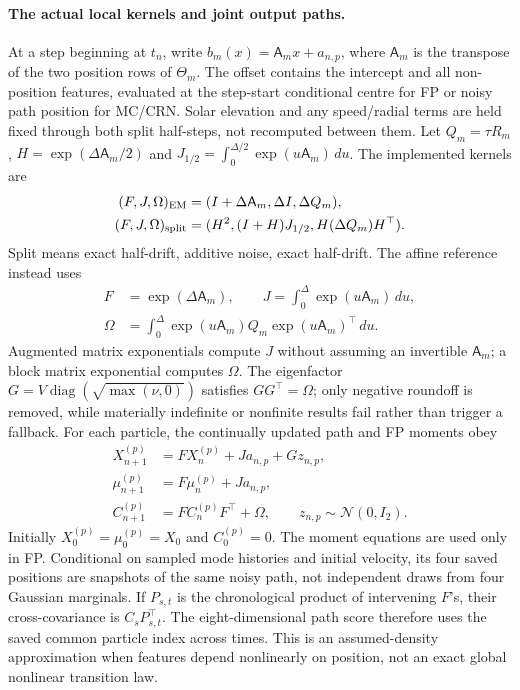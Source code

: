 \documentclass[11pt]{article}
\begin{document}
\paragraph{The actual local kernels and joint output paths.}
At a step beginning at \(t_n\), write
\(b_m(x)=\mathsf A_m x+a_{n,p}\), where \(\mathsf A_m\) is the transpose
of the two position rows of \(\Theta_m\).
The offset contains the intercept and all non-position features, evaluated
at the step-start conditional centre for FP or noisy path position for MC/CRN.
Solar elevation and any speed/radial terms are held fixed through both split
half-steps, not recomputed between them. Let \(Q_m=\tau R_m\),
\(H=\exp(\Delta\mathsf A_m/2)\) and
\(J_{1/2}=\int_0^{\Delta/2}\exp(u\mathsf A_m)\,du\). The implemented kernels are
\begin{equation}
 \begin{aligned}
 (F,J,\Omega)_{\rm EM}&=(I+\Delta\mathsf A_m,\Delta I,\Delta Q_m),\\
 (F,J,\Omega)_{\rm split}&=(H^2,(I+H)J_{1/2},H(\Delta Q_m)H^\top).
 \end{aligned}
 \label{eq:method-kernels}
\end{equation}
Split means exact half-drift, additive noise, exact half-drift. The affine
reference instead uses
\begin{equation}
 \begin{aligned}
 F&=\exp(\Delta\mathsf A_m),\qquad
 J=\int_0^\Delta\exp(u\mathsf A_m)\,du,\\
 \Omega&=\int_0^\Delta\exp(u\mathsf A_m)Q_m
                              \exp(u\mathsf A_m)^\top\,du.
 \end{aligned}
 \label{eq:method-affine-exact}
\end{equation}
Augmented matrix exponentials compute \(J\) without assuming an invertible
\(\mathsf A_m\); a block matrix exponential computes \(\Omega\).
The eigenfactor \(G=V\operatorname{diag}(\sqrt{\max(\nu,0)})\) satisfies
\(GG^\top=\Omega\); only negative roundoff is removed, while materially
indefinite or nonfinite results fail rather than trigger a fallback.
For each particle, the continually updated path and FP moments obey
\begin{equation}
 \begin{aligned}
 X_{n+1}^{(p)}&=F X_n^{(p)}+J a_{n,p}+Gz_{n,p},\\
 \mu_{n+1}^{(p)}&=F\mu_n^{(p)}+J a_{n,p},\\
 C_{n+1}^{(p)}&=F C_n^{(p)}F^\top+\Omega,
 \qquad z_{n,p}\sim\mathcal N(0,I_2).
 \end{aligned}
 \label{eq:method-joint-propagation}
\end{equation}
Initially \(X_0^{(p)}=\mu_0^{(p)}=X_0\) and \(C_0^{(p)}=0\).
The moment equations are used only in FP. Conditional on sampled mode
histories and initial velocity, its four saved positions are snapshots of the
same noisy path, not independent draws from four Gaussian marginals. If
\(P_{s,t}\) is the chronological product of intervening \(F\)'s, their
cross-covariance is \(C_sP_{s,t}^{\top}\). The eight-dimensional path score
therefore uses the saved common particle index across times. This is an
assumed-density approximation when features depend nonlinearly on position,
not an exact global nonlinear transition law.
\end{document}
